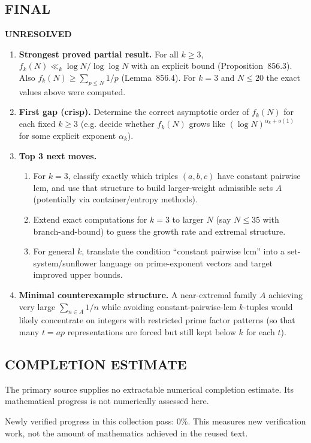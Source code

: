 \subsection*{FINAL}
\textbf{UNRESOLVED}
\begin{enumerate}
\item[(i)] \textbf{Strongest proved partial result.} For all $k\ge 3$, $f_k(N)\ll_k \log N/\log\log N$ with an explicit bound (Proposition~856.3). Also $f_k(N)\ge \sum_{p\le N} 1/p$ (Lemma~856.4). For $k=3$ and $N\le 20$ the exact values above were computed.
\item[(ii)] \textbf{First gap (crisp).} Determine the correct asymptotic order of $f_k(N)$ for each fixed $k\ge 3$ (e.g. decide whether $f_k(N)$ grows like $(\log N)^{\alpha_k+o(1)}$ for some explicit exponent $\alpha_k$).
\item[(iii)] \textbf{Top 3 next moves.}
  \begin{enumerate}
  \item For $k=3$, classify exactly which triples $(a,b,c)$ have constant pairwise lcm, and use that structure to build larger-weight admissible sets $A$ (potentially via container/entropy methods).
  \item Extend exact computations for $k=3$ to larger $N$ (say $N\le 35$ with branch-and-bound) to guess the growth rate and extremal structure.
  \item For general $k$, translate the condition ``constant pairwise lcm'' into a set-system/sunflower language on prime-exponent vectors and target improved upper bounds.
  \end{enumerate}
\item[(iv)] \textbf{Minimal counterexample structure.} A near-extremal family $A$ achieving very large $\sum_{n\in A}1/n$ while avoiding constant-pairwise-lcm $k$-tuples would likely concentrate on integers with restricted prime factor patterns (so that many $t=ap$ representations are forced but still kept below $k$ for each $t$).
\end{enumerate}



\subsection*{COMPLETION ESTIMATE}
The primary source supplies no extractable numerical completion estimate. Its mathematical progress is not numerically assessed here.

Newly verified progress in this collection pass: $0\%$. This measures new verification work, not the amount of mathematics achieved in the reused text.
